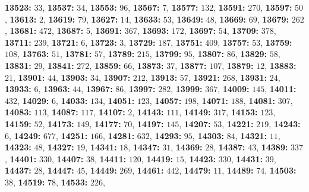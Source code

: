 \textsf{\bfseries 13523:} $33$, \textsf{\bfseries 13537:} $34$, \textsf{\bfseries 13553:} $96$, \textsf{\bfseries 13567:} $7$, \textsf{\bfseries 13577:} $132$, \textsf{\bfseries 13591:} $270$, \textsf{\bfseries 13597:} $50$, \textsf{\bfseries 13613:} $2$, \textsf{\bfseries 13619:} $79$, \textsf{\bfseries 13627:} $14$, \textsf{\bfseries 13633:} $53$, \textsf{\bfseries 13649:} $48$, \textsf{\bfseries 13669:} $69$, \textsf{\bfseries 13679:} $262$, \textsf{\bfseries 13681:} $472$, \textsf{\bfseries 13687:} $5$, \textsf{\bfseries 13691:} $367$, \textsf{\bfseries 13693:} $172$, \textsf{\bfseries 13697:} $54$, \textsf{\bfseries 13709:} $378$, \textsf{\bfseries 13711:} $239$, \textsf{\bfseries 13721:} $6$, \textsf{\bfseries 13723:} $3$, \textsf{\bfseries 13729:} $187$, \textsf{\bfseries 13751:} $409$, \textsf{\bfseries 13757:} $53$, \textsf{\bfseries 13759:} $108$, \textsf{\bfseries 13763:} $51$, \textsf{\bfseries 13781:} $57$, \textsf{\bfseries 13789:} $215$, \textsf{\bfseries 13799:} $95$, \textsf{\bfseries 13807:} $86$, \textsf{\bfseries 13829:} $58$, \textsf{\bfseries 13831:} $29$, \textsf{\bfseries 13841:} $272$, \textsf{\bfseries 13859:} $66$, \textsf{\bfseries 13873:} $37$, \textsf{\bfseries 13877:} $107$, \textsf{\bfseries 13879:} $12$, \textsf{\bfseries 13883:} $21$, \textsf{\bfseries 13901:} $44$, \textsf{\bfseries 13903:} $34$, \textsf{\bfseries 13907:} $212$, \textsf{\bfseries 13913:} $57$, \textsf{\bfseries 13921:} $268$, \textsf{\bfseries 13931:} $24$, \textsf{\bfseries 13933:} $6$, \textsf{\bfseries 13963:} $44$, \textsf{\bfseries 13967:} $86$, \textsf{\bfseries 13997:} $282$, \textsf{\bfseries 13999:} $367$, \textsf{\bfseries 14009:} $145$, \textsf{\bfseries 14011:} $432$, \textsf{\bfseries 14029:} $6$, \textsf{\bfseries 14033:} $134$, \textsf{\bfseries 14051:} $123$, \textsf{\bfseries 14057:} $198$, \textsf{\bfseries 14071:} $188$, \textsf{\bfseries 14081:} $307$, \textsf{\bfseries 14083:} $113$, \textsf{\bfseries 14087:} $117$, \textsf{\bfseries 14107:} $2$, \textsf{\bfseries 14143:} $111$, \textsf{\bfseries 14149:} $317$, \textsf{\bfseries 14153:} $123$, \textsf{\bfseries 14159:} $52$, \textsf{\bfseries 14173:} $149$, \textsf{\bfseries 14177:} $70$, \textsf{\bfseries 14197:} $145$, \textsf{\bfseries 14207:} $53$, \textsf{\bfseries 14221:} $219$, \textsf{\bfseries 14243:} $6$, \textsf{\bfseries 14249:} $677$, \textsf{\bfseries 14251:} $166$, \textsf{\bfseries 14281:} $632$, \textsf{\bfseries 14293:} $95$, \textsf{\bfseries 14303:} $84$, \textsf{\bfseries 14321:} $11$, \textsf{\bfseries 14323:} $48$, \textsf{\bfseries 14327:} $19$, \textsf{\bfseries 14341:} $18$, \textsf{\bfseries 14347:} $31$, \textsf{\bfseries 14369:} $28$, \textsf{\bfseries 14387:} $43$, \textsf{\bfseries 14389:} $337$, \textsf{\bfseries 14401:} $330$, \textsf{\bfseries 14407:} $38$, \textsf{\bfseries 14411:} $120$, \textsf{\bfseries 14419:} $15$, \textsf{\bfseries 14423:} $330$, \textsf{\bfseries 14431:} $39$, \textsf{\bfseries 14437:} $28$, \textsf{\bfseries 14447:} $45$, \textsf{\bfseries 14449:} $269$, \textsf{\bfseries 14461:} $442$, \textsf{\bfseries 14479:} $11$, \textsf{\bfseries 14489:} $74$, \textsf{\bfseries 14503:} $38$, \textsf{\bfseries 14519:} $78$, \textsf{\bfseries 14533:} $226$, 
